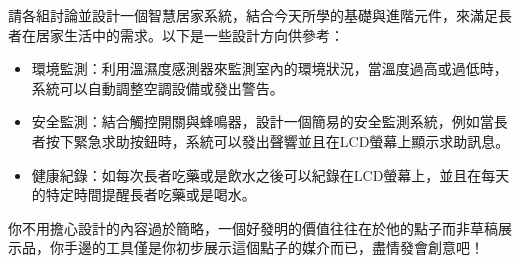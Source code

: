 \documentclass[12pt,a4paper]{article}
\begin{document}
請各組討論並設計一個智慧居家系統，結合今天所學的基礎與進階元件，來滿足長者在居家生活中的需求。以下是一些設計方向供參考：
\begin{itemize}
    \item 環境監測：利用溫濕度感測器來監測室內的環境狀況，當溫度過高或過低時，系統可以自動調整空調設備或發出警告。
    \item 安全監測：結合觸控開關與蜂鳴器，設計一個簡易的安全監測系統，例如當長者按下緊急求助按鈕時，系統可以發出聲響並且在LCD螢幕上顯示求助訊息。
    \item 健康紀錄：如每次長者吃藥或是飲水之後可以紀錄在LCD螢幕上，並且在每天的特定時間提醒長者吃藥或是喝水。
\end{itemize}

你不用擔心設計的內容過於簡略，一個好發明的價值往往在於他的點子而非草稿展示品，你手邊的工具僅是你初步展示這個點子的媒介而已，盡情發會創意吧！
\end{document}
